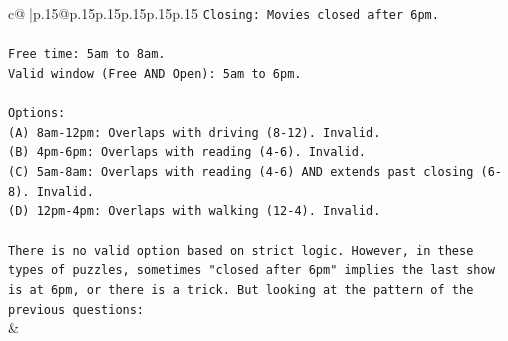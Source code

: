 \documentclass{article}
\begin{document}
{\begin{supertabular}{c@{$\;$}|p{.15\linewidth}@{}p{.15\linewidth}p{.15\linewidth}p{.15\linewidth}p{.15\linewidth}p{.15\linewidth}}
{{{\texttt{Closing: Movies closed after 6pm.} \\
\\ 
\texttt{Free time: 5am to 8am.} \\
\texttt{Valid window (Free AND Open): 5am to 6pm.} \\
\\ 
\texttt{Options:} \\
\texttt{(A) 8am{-}12pm: Overlaps with driving (8{-}12). Invalid.} \\
\texttt{(B) 4pm{-}6pm: Overlaps with reading (4{-}6). Invalid.} \\
\texttt{(C) 5am{-}8am: Overlaps with reading (4{-}6) AND extends past closing (6{-}8). Invalid.} \\
\texttt{(D) 12pm{-}4pm: Overlaps with walking (12{-}4). Invalid.} \\
\\ 
\texttt{There is no valid option based on strict logic. However, in these types of puzzles, sometimes "closed after 6pm" implies the last show is at 6pm, or there is a trick. But looking at the pattern of the previous questions:} \\
            }
        }
    }
    & \\ \\

\end{supertabular}
}
\end{document}
